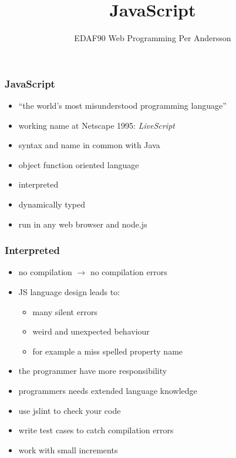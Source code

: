 \documentclass[aspectratio=1610]{beamer}
\title[JavaScript]{JavaScript}
\author[EDAF90]{%
  EDAF90 Web Programming\newline
  Per Andersson}
\begin{document}
\begin{frame}[plain]%
  \titlepage
\end{frame}

\begin{frame}
  \frametitle{JavaScript}

\begin{itemize}
\item ``the world's most misunderstood programming language''
\item working name at Netscape 1995: \emph{LiveScript}
\item syntax and name in common with Java
\item object function oriented language
\item interpreted
\item dynamically typed 
\item run in any web browser and node.js
\end{itemize}
\end{frame}

\begin{frame}
  \frametitle{Interpreted}

\begin{itemize}
\item no compilation $\rightarrow$ no compilation errors
\item JS language design leads to:
  \begin{itemize}
  \item many silent errors
  \item weird and unexpected behaviour
  \item for example a miss spelled  property name
  \end{itemize}
\item the programmer have more responsibility
\item programmers needs extended language knowledge
\item use jslint to check your code
\item write test cases to catch compilation errors
\item work with small increments
\end{itemize}
\end{frame}





\end{document}
